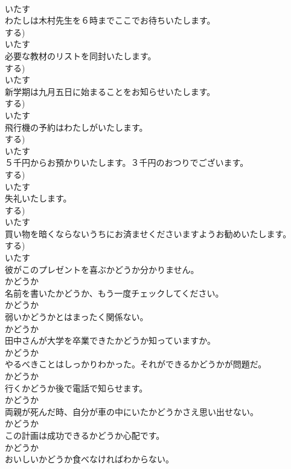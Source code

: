\documentclass[8pt]{extreport}
\begin{document}
\begin{CJK}{UTF8}{min}
\\	いたす	
\\	わたしは木村先生を６時までここでお待ちいたします。	
\\	する)	
\\	いたす	
\\	必要な教材のリストを同封いたします。	
\\	する)	
\\	いたす	
\\	新学期は九月五日に始まることをお知らせいたします。	
\\	する)	
\\	いたす	
\\	飛行機の予約はわたしがいたします。	
\\	する)	
\\	いたす	
\\	５千円からお預かりいたします。３千円のおつりでございます。	
\\	する)	
\\	いたす	
\\	失礼いたします。	
\\	する)	
\\	いたす	
\\	買い物を暗くならないうちにお済ませくださいますようお勧めいたします。	
\\	する)	
\\	いたす	
\\	彼がこのプレゼントを喜ぶかどうか分かりません。	
\\	かどうか	
\\	名前を書いたかどうか、もう一度チェックしてください。	
\\	かどうか	
\\	弱いかどうかとはまったく関係ない。	
\\	かどうか	
\\	田中さんが大学を卒業できたかどうか知っていますか。	
\\	かどうか	
\\	やるべきことはしっかりわかった。それができるかどうかが問題だ。	
\\	かどうか	
\\	行くかどうか後で電話で知らせます。	
\\	かどうか	
\\	両親が死んだ時、自分が車の中にいたかどうかさえ思い出せない。	
\\	かどうか	
\\	この計画は成功できるかどうか心配です。	
\\	かどうか	
\\	おいしいかどうか食べなければわからない。	

\end{CJK}
\end{document}
